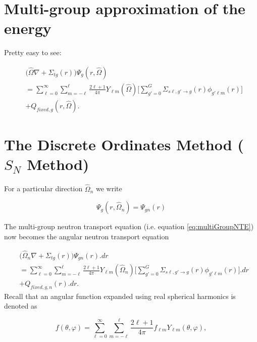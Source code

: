 \documentclass[11pt,letterpaper,titlepage]{article}
\numberwithin{equation}{section}
\begin{document}
\vspace{1cm}
\section{Multi-group approximation of the energy}
Pretty easy to see:


\begin{equation} \label{eq:multiGroupNTE}
\begin{aligned}
&\biggr(\hat{\Omega}\nabla +\Sigma_{tg} (r)\biggr)  \Psi_g (r,\hat{\Omega})\\
&= \sum_{\ell=0}^{\infty}\sum_{m=-\ell}^{\ell}\frac{2\ell+1}{4\pi} Y_{\ell m}(\hat{\Omega})
\biggr[ \sum_{g'=0}^{G}
\Sigma_{s\ell,g'{\to}g} (r)
  \phi_{g'\ell m} (r)
\biggr]\\
&+  Q_{fixed,g} (r,\hat{\Omega}).
\end{aligned}
\end{equation}







\newpage
{}
\section{The Discrete Ordinates Method ($S_N$ Method)}
For a particular direction $\hat{\Omega}_n$ we write

$$\Psi_g (r,\hat{\Omega}_n) = \Psi_{gn}(r)$$

The multi-group neutron transport equation (i.e. equation \ref{eq:multiGroupNTE}) now becomes the angular neutron transport equation


\begin{equation} \label{eq:angularNTE}
\begin{aligned}
&\biggr(\hat{\Omega}_n\nabla +\Sigma_{tg} (r)\biggr)  \Psi_{gn} (r).dr\\
&= \sum_{\ell=0}^{\infty}\sum_{m=-\ell}^{\ell} \frac{2\ell+1}{4\pi}Y_{\ell m}(\hat{\Omega}_n)
\biggr[ \sum_{g'=0}^{G}
\Sigma_{s\ell,g'{\to}g} (r)
\phi_{g'\ell m} (r)
\biggr] .dr\\
&+  Q_{fixed,g,n} (r).dr.
\end{aligned}
\end{equation}
\newline
Recall that an angular function expanded using real spherical harmonics is denoted as

$$f(\theta,\varphi) = \sum_{\ell=0}^\infty \sum_{m=-\ell}^\ell  \frac{2\ell+1}{4\pi} f_{\ell m}Y_{\ell m} (\theta,\varphi),$$
\end{document}
